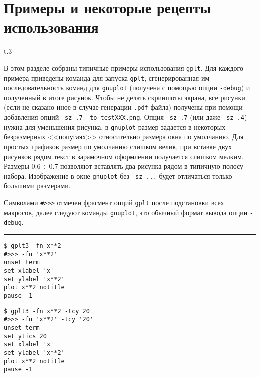\documentclass[12pt]{article}
\def\gplt{{\tt gplt}}
\def\gnuplot{{\tt gnuplot}}
\def\pdf{{\tt .pdf}}
\begin{document}
\section{Примеры и некоторые рецепты использования}
\begin{wrapfigure}[7]{t}{.3\textwidth}
  \vphantom{.}
  \vspace{-1cm}

\end{wrapfigure}
В этом разделе собраны типичные примеры использования \gplt.
Для каждого примера приведены команда для запуска \gplt, сгенерированная им последовательность команд
для \gnuplot{} (получена с помощью опции \verb'-debug') и полученный в итоге рисунок.
Чтобы не делать скриншоты экрана, все рисунки (если не сказано иное в случае генерации \pdf-файла) получены при помощи добавления
опций \verb'-sz .7 -to testXXX.png'. Опция \verb'-sz .7' (или даже \verb'-sz .4') нужна для уменьшения рисунка,
в \gnuplot{} размер задается в некоторых безразмерных <<попугаях>> относительно размера окна по умолчанию.
Для простых графиков размер по умолчанию слишком велик, при вставке двух рисунков рядом текст
в зарамочном оформлении получается слишком мелким. Размеры $0.6\div0.7$ позволяют вставлять два рисунка рядом в типичную полосу набора. 
Изображение в окне \gnuplot{} без \verb'-sz ...' будет отличаться только большими размерами.

Символами \verb'#>>>' отмечен фрагмент опций \gplt{} после подстановки всех макросов, далее следуют команды \gnuplot,
это обычный формат вывода опции \verb'-debug'.\\

\hrule %

\vspace{3mm}
\noindent
\begin{minipage}[b]{0.19\textwidth}\small
\begin{verbatim}
$ gplt3 -fn x**2 
#>>> -fn 'x**2'
unset term
set xlabel 'x'
set ylabel 'x**2'
plot x**2 notitle   
pause -1
\end{verbatim}
\end{minipage}
\hfill
\begin{minipage}[b]{0.27\textwidth}\small
\begin{verbatim}
$ gplt3 -fn x**2 -tcy 20
#>>> -fn 'x**2' -tcy '20'
unset term
set ytics 20
set xlabel 'x'
set ylabel 'x**2'
plot x**2 notitle   
pause -1
\end{verbatim}
\end{minipage}
\end{document}
